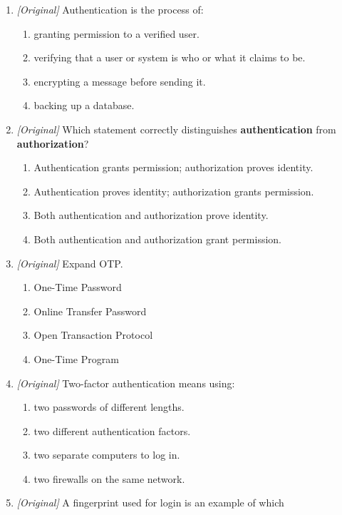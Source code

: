 \documentclass[11pt]{article}
\begin{document}
\begin{enumerate}[label=\textbf{Q\arabic*.}, leftmargin=*]
\begin{enumerate}[label=\Alph*.]
    \item A handwritten office register
  \end{enumerate}
\item \textit{[Original]} Authentication is the process of:
  \begin{enumerate}[label=\Alph*.]
    \item granting permission to a verified user.
    \item verifying that a user or system is who or what it claims to be.
    \item encrypting a message before sending it.
    \item backing up a database.
  \end{enumerate}
\item \textit{[Original]} Which statement correctly distinguishes
  \textbf{authentication} from \textbf{authorization}?
  \begin{enumerate}[label=\Alph*.]
    \item Authentication grants permission; authorization proves identity.
    \item Authentication proves identity; authorization grants permission.
    \item Both authentication and authorization prove identity.
    \item Both authentication and authorization grant permission.
  \end{enumerate}
\item \textit{[Original]} Expand OTP.
  \begin{enumerate}[label=\Alph*.]
    \item One-Time Password
    \item Online Transfer Password
    \item Open Transaction Protocol
    \item One-Time Program
  \end{enumerate}
\item \textit{[Original]} Two-factor authentication means using:
  \begin{enumerate}[label=\Alph*.]
    \item two passwords of different lengths.
    \item two different authentication factors.
    \item two separate computers to log in.
    \item two firewalls on the same network.
  \end{enumerate}
\item \textit{[Original]} A fingerprint used for login is an example of which

\end{enumerate}
\end{document}
